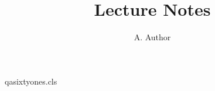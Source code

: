 \begin{filecontents*}[overwrite]{qasixtyones.cls}
\newcommand\msc[1]{\gdef\@msc{#1}}
\newcommand\mail[1]{\gdef\@mail{#1}}
\renewcommand\maketitle{\begingroup\@maketitle\endgroup\global\let\@msc\relax\global\let\@mail\relax}
\renewcommand\@maketitle{\begin{center}{\LARGE \@title\par}{\large \@author\par}\end{center}
  \textbf{E-mail:} \texttt{\@mail}.

  \footnotetext{2020 {\itshape Mathematics Subject Classification} \@msc.}\par}
\end{filecontents*}
\documentclass{qasixtyones}
\title{Lecture Notes}
\author{A. Author}

\maketitle
Text.

